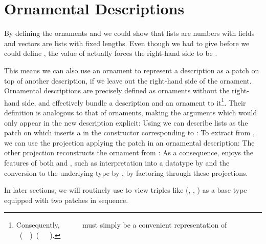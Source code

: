 
\section{Ornamental Descriptions}\label{sec:background-ornamental-descriptions}
By defining the ornaments  and  we could show that lists are numbers with fields and vectors are lists with fixed lengths. Even though we had to give  before we could define , the value of  actually forces the right-hand side to be .

This means we can also use an ornament to represent a description as a patch on top of another description, if we leave out the right-hand side of the ornament. Ornamental descriptions are precisely defined as ornaments without the right-hand side, and effectively bundle a description and an ornament to it\footnote{Consequently, \ \ \ \ \  must simply be a convenient representation of \ (\ \ )\ (\ \ \ ).}. Their definition is analogous to that of ornaments, making the arguments which would only appear in the new description explicit:
Using  we can describe lists as the patch on  which inserts a  in the constructor corresponding to :
To extract  from , we can use the projection applying the patch in an ornamental description:
The other projection reconstructs the ornament  from :
As a consequence,  enjoys the features of both  and , such as interpretation into a datatype by  and the conversion to the underlying type by , by factoring through these projections.

In later sections, %
we will routinely use  to view triples like (, , ) as a base type equipped with two patches in sequence.


